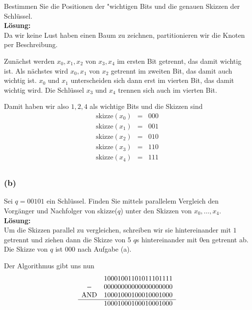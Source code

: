 \documentclass[11pt,a4paper,ngerman]{article}
\begin{document}
Bestimmen Sie die Positionen der "wichtigen\grqq{} Bits und die genauen Skizzen der Schlüssel.\\

\noindent\textbf{Lösung:}\\

Da wir keine Lust haben einen Baum zu zeichnen, partitionieren wir die Knoten per
Beschreibung.

Zunächst werden $x_0,x_1,x_2$ von $x_3,x_4$ im ersten Bit getrennt, das damit
wichtig ist. Als nächstes wird $x_0,x_1$ von $x_2$ getrennt im zweiten Bit,
das damit auch wichtig ist. $x_0$ und $x_1$ unterscheiden sich dann erst im vierten Bit, das damit wichtig wird. Die Schlüssel $x_3$ und $x_4$ trennen sich auch im vierten Bit.

Damit haben wir also $1,2,4$ als wichtige Bits und die Skizzen sind
$$
\begin{array}{rcl}
   \text{skizze}(x_0) &=& 000\\  
   \text{skizze}(x_1) &=& 001\\  
   \text{skizze}(x_2) &=& 010\\  
   \text{skizze}(x_3) &=& 110\\  
   \text{skizze}(x_4) &=& 111\\  
\end{array}
$$


\subsubsection*{(b)}

Sei $q= 00101$ ein Schlüssel. Finden Sie mittels parallelem Vergleich den
Vorgänger und Nachfolger von skizze($q$) unter den Skizzen von $x_0, \ldots, x_4$.\\

\noindent\textbf{Lösung:}\\
Um die Skizzen parallel zu vergleichen, schreiben wir sie hintereinander
mit $1$ getrennt und ziehen dann die Skizze von 5 $q$s hintereinander mit 0en getrennt ab. Die
Skizze von $q$ ist $000$ nach Aufgabe (a).

Der Algorithmus gibt uns nun
$$
\begin{array}{cl}
     & 1 000 1 001 1 010 1 110 1 111\\
   - & 0 000 0 000 0 000 0 000 0 000\\
   \text{AND} & 1 000 1 000 1 000 1 000 1 000\\
   \hline
   & 1 000 1 000 1 000 1 000 1 000
\end{array}
$$
\end{document}
